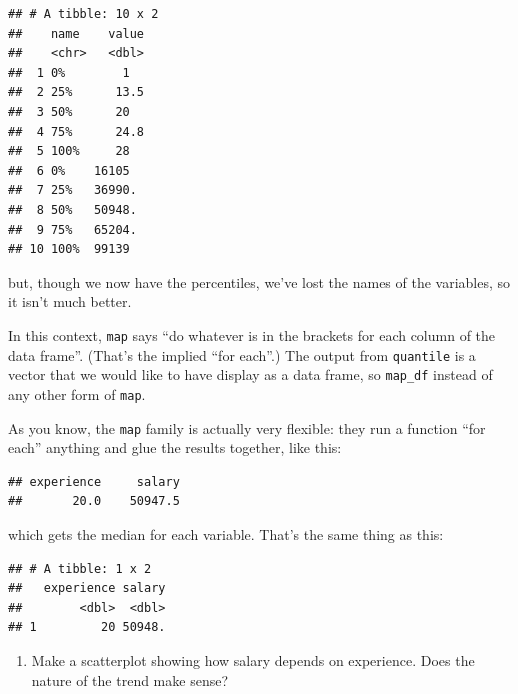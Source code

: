 \documentclass[]{tufte-book}
\newenvironment{Shaded}{}{}
\newcommand{\KeywordTok}[1]{\textcolor[rgb]{0.00,0.44,0.13}{\textbf{#1}}}
\newcommand{\NormalTok}[1]{#1}
\newcommand{\OperatorTok}[1]{\textcolor[rgb]{0.40,0.40,0.40}{#1}}
\newcommand{\StringTok}[1]{\textcolor[rgb]{0.25,0.44,0.63}{#1}}
\providecommand{\tightlist}{%
  \setlength{\itemsep}{0pt}\setlength{\parskip}{0pt}}
\theoremstyle{definition}
\theoremstyle{definition}
\theoremstyle{definition}
\theoremstyle{remark}
\begin{document}
\begin{verbatim}
## # A tibble: 10 x 2
##    name    value
##    <chr>   <dbl>
##  1 0%        1  
##  2 25%      13.5
##  3 50%      20  
##  4 75%      24.8
##  5 100%     28  
##  6 0%    16105  
##  7 25%   36990. 
##  8 50%   50948. 
##  9 75%   65204. 
## 10 100%  99139
\end{verbatim}

but, though we now have the percentiles, we've lost the names of the
variables, so it isn't much better.

In this context, \texttt{map} says ``do whatever is in the brackets for
each column of the data frame''. (That's the implied ``for each''.) The
output from \texttt{quantile} is a vector that we would like to have
display as a data frame, so \texttt{map\_df} instead of any other form
of \texttt{map}.

As you know, the \texttt{map} family is actually very flexible: they run
a function ``for each'' anything and glue the results together, like
this:

\begin{Shaded}
\end{Shaded}

\begin{verbatim}
## experience     salary 
##       20.0    50947.5
\end{verbatim}

which gets the median for each variable. That's the same thing as this:

\begin{Shaded}
\end{Shaded}

\begin{verbatim}
## # A tibble: 1 x 2
##   experience salary
##        <dbl>  <dbl>
## 1         20 50948.
\end{verbatim}

\begin{enumerate}
\def\labelenumi{(\alph{enumi})}
\setcounter{enumi}{1}
\tightlist
\item
  Make a scatterplot showing how salary depends on experience. Does the
  nature of the trend make sense?
\end{enumerate}
\end{document}
